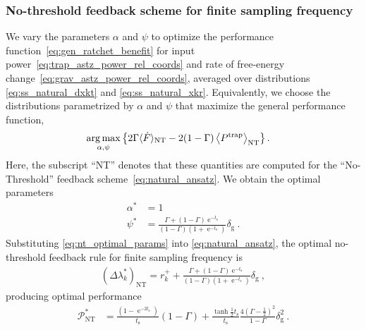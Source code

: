 \documentclass[%
reprint,
bibnotes, amsmath, amssymb, aps, pre,
 showkeys,
floatfix
]{revtex4-2}
\newcommand{\mrm}{\mathrm}
\newcommand{\mcal}{\mathcal}
\newcommand{\pr}[1]{\left(#1\right)} %
\newcommand{\br}[1]{\left\{#1\right\}} %
\newcommand{\dg}{\delta_{\mrm{g}}}
\newcommand{\ts}{t_{\mrm{s}}}
\newcommand{\dlk}{\Delta\lambda_{k}}
\newcommand{\xkpr}{r_{k}^{+}}
\newcommand{\ept}{\ev{P^{\mrm{trap}}}}
\newcommand{\epg}{\langle\dot{F}\rangle}
\newcommand{\mP}{\mcal{P}}
\DeclareMathOperator{\e}{e}
\DeclareMathOperator*{\argmax}{arg\,max}
\begin{document}
\subsubsection{No-threshold feedback scheme for finite sampling frequency}

We vary the parameters $\alpha$ and $\psi$ to optimize the performance function~\eqref{eq:gen_ratchet_benefit} for input power~\eqref{eq:trap_astz_power_rel_coords} and rate of free-energy change~\eqref{eq:grav_astz_power_rel_coords}, averaged over distributions \eqref{eq:ss_natural_dxkt} and \eqref{eq:ss_natural_xkr}.
Equivalently, we choose the distributions parametrized by $\alpha$ and $\psi$ that maximize the general performance function,
\begin{align}
    \argmax_{\alpha,\psi}&\br{2\Gamma\epg_{\mrm{NT}}-2(1-\Gamma)\ept_{\mrm{NT}}}.
\end{align}
Here, the subscript ``NT'' denotes that these quantities are computed for the ``No-Threshold'' feedback scheme~\eqref{eq:natural_ansatz}. 
We obtain the optimal parameters
\begin{subequations}\label{eq:nt_optimal_params}
    \begin{align}
        \alpha^{*} &= 1\label{eq:nt_optimal_params1}\\
        \psi^{*} &= \frac{\Gamma+(1-\Gamma)\e^{-\ts}}{(1-\Gamma)(1+\e^{-\ts})}\dg\ .
    \end{align}
\end{subequations}
Substituting \eqref{eq:nt_optimal_params} into \eqref{eq:natural_ansatz}, the optimal no-threshold feedback rule for finite sampling frequency is 
\begin{align}
    \pr{\dlk^{*}}_{\mrm{NT}} = \xkpr + \frac{\Gamma+(1-\Gamma)\e^{-\ts}}{(1-\Gamma)(1+\e^{-\ts})}\dg\ ,\label{eq:full_non_cont_feedback}
\end{align}
producing optimal performance 
\begin{align}
    \mP_{\mrm{NT}}^{*} &=
    \frac{\pr{1-\e^{-2\ts}}}{\ts}\pr{1-\Gamma} + \frac{\tanh\tfrac{1}{2}\ts}{\ts}\frac{4\pr{\Gamma-\tfrac{1}{2}}^{2}}{1-\Gamma}\dg^{2}\ . 
    \label{eq:opt_fin_time_perf_func}
\end{align}
\end{document}
